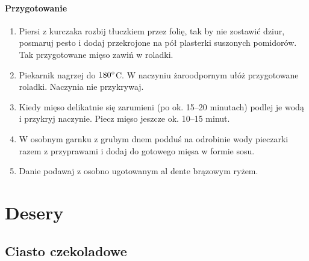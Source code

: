 \documentclass{article}
\begin{document}
    \paragraph{Przygotowanie}
    \begin{enumerate}
        \item Piersi z kurczaka rozbij tłuczkiem przez folię, tak by nie
            zostawić dziur, posmaruj pesto i dodaj przekrojone na pół plasterki
            suszonych pomidorów. Tak przygotowane mięso zawiń w roladki.
        \item Piekarnik nagrzej do $180\degree$C. W naczyniu żaroodpornym ułóż
            przygotowane roladki. Naczynia nie przykrywaj.
        \item Kiedy mięso delikatnie się zarumieni (po ok. 15–20 minutach)
            podlej je wodą i przykryj naczynie. Piecz mięso jeszcze ok. 10–15
            minut.
        \item W osobnym garnku z grubym dnem podduś na odrobinie wody pieczarki
            razem z przyprawami i dodaj do gotowego mięsa w formie sosu.
        \item Danie podawaj z osobno ugotowanym al dente brązowym ryżem.
    \end{enumerate}
    \newpage

    \section{Desery}
    \medskip
    \subsection{Ciasto czekoladowe}
    \bigskip
\end{document}
